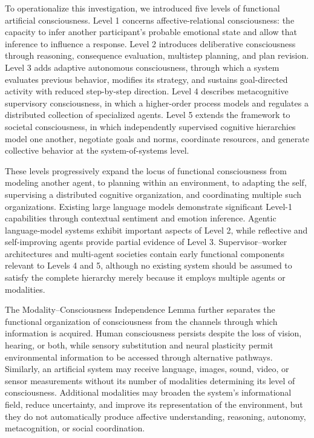 To operationalize this investigation, we introduced five levels of functional artificial consciousness. Level 1 concerns affective-relational consciousness: the capacity to infer another participant’s probable emotional state and allow that inference to influence a response. Level 2 introduces deliberative consciousness through reasoning, consequence evaluation, multistep planning, and plan revision. Level 3 adds adaptive autonomous consciousness, through which a system evaluates previous behavior, modifies its strategy, and sustains goal-directed activity with reduced step-by-step direction. Level 4 describes metacognitive supervisory consciousness, in which a higher-order process models and regulates a distributed collection of specialized agents. Level 5 extends the framework to societal consciousness, in which independently supervised cognitive hierarchies model one another, negotiate goals and norms, coordinate resources, and generate collective behavior at the system-of-systems level.

These levels progressively expand the locus of functional consciousness from modeling another agent, to planning within an environment, to adapting the self, supervising a distributed cognitive organization, and coordinating multiple such organizations. Existing large language models demonstrate significant Level-1 capabilities through contextual sentiment and emotion inference. Agentic language-model systems exhibit important aspects of Level 2, while reflective and self-improving agents provide partial evidence of Level 3. Supervisor–worker architectures and multi-agent societies contain early functional components relevant to Levels 4 and 5, although no existing system should be assumed to satisfy the complete hierarchy merely because it employs multiple agents or modalities.

The Modality–Consciousness Independence Lemma further separates the functional organization of consciousness from the channels through which information is acquired. Human consciousness persists despite the loss of vision, hearing, or both, while sensory substitution and neural plasticity permit environmental information to be accessed through alternative pathways. Similarly, an artificial system may receive language, images, sound, video, or sensor measurements without its number of modalities determining its level of consciousness. Additional modalities may broaden the system’s informational field, reduce uncertainty, and improve its representation of the environment, but they do not automatically produce affective understanding, reasoning, autonomy, metacognition, or social coordination.

